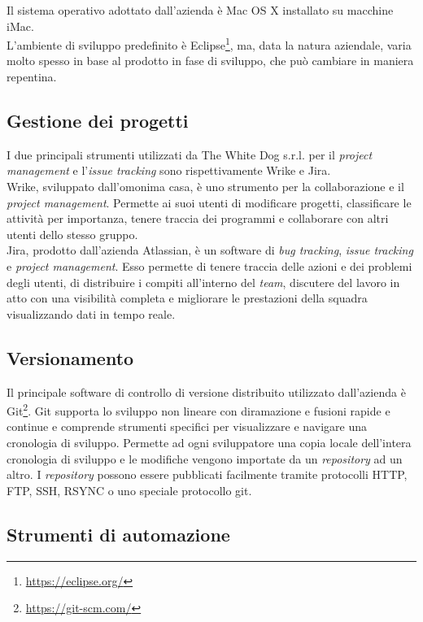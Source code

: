 Il sistema operativo adottato dall'azienda è Mac OS X installato su macchine iMac. \\
L'ambiente di sviluppo predefinito è Eclipse\footnote[8]{\url{https://eclipse.org/}}, ma, data la natura aziendale, varia molto spesso in base al prodotto in fase di sviluppo, che può cambiare in maniera repentina. 

\subsection{Gestione dei progetti}

I due principali strumenti utilizzati da The White Dog s.r.l. per il \textit{project management} e l'\textit{issue tracking} sono rispettivamente Wrike e Jira.\\
Wrike, sviluppato dall'omonima casa, è uno strumento per la collaborazione e il \textit{project management}. Permette ai suoi utenti di modificare progetti, classificare le attività per importanza, tenere traccia dei programmi e collaborare con altri utenti dello stesso gruppo. \\
Jira, prodotto dall'azienda Atlassian, è un software di \textit{bug tracking}, \textit{issue tracking} e \textit{project management}. Esso permette di tenere traccia delle azioni e dei problemi degli utenti, di distribuire i compiti all'interno del \textit{team}, discutere del lavoro in atto con una visibilità completa e migliorare le prestazioni della squadra visualizzando dati in tempo reale.

\subsection{Versionamento}

Il principale software di controllo di versione distribuito utilizzato dall'azienda è Git\footnote[9]{\url{https://git-scm.com/}}. Git supporta lo sviluppo non lineare con diramazione e fusioni rapide e continue e comprende strumenti specifici per visualizzare e navigare una cronologia di sviluppo. Permette ad ogni sviluppatore una copia locale dell'intera cronologia di sviluppo e le modifiche vengono importate da un \textit{repository} ad un altro. I \textit{repository} possono essere pubblicati facilmente tramite protocolli HTTP, FTP, SSH, RSYNC o uno speciale protocollo git.

\subsection{Strumenti di automazione}

